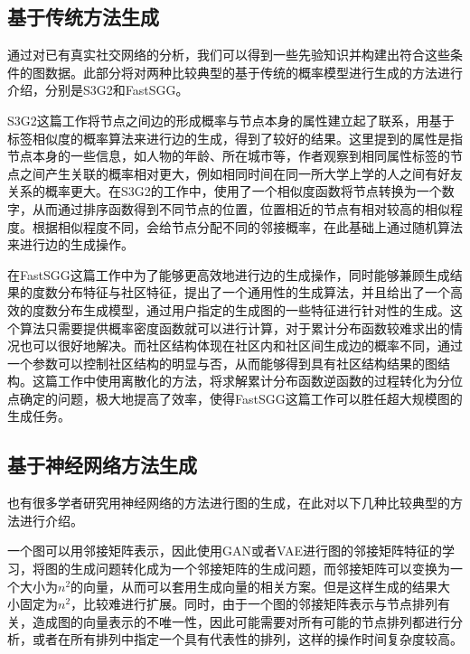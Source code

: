 \subsection{基于传统方法生成}

通过对已有真实社交网络的分析，我们可以得到一些先验知识并构建出符合这些条件的图数据。此部分将对两种比较典型的基于传统的概率模型进行生成的方法进行介绍，分别是S3G2\cite{Minh2012S3G2}和FastSGG\cite{FastSGG}。

S3G2\cite{Minh2012S3G2}这篇工作将节点之间边的形成概率与节点本身的属性建立起了联系，用基于标签相似度的概率算法来进行边的生成，得到了较好的结果。这里提到的属性是指节点本身的一些信息，如人物的年龄、所在城市等，作者观察到相同属性标签的节点之间产生关联的概率相对更大，例如相同时间在同一所大学上学的人之间有好友关系的概率更大。在S3G2的工作中，使用了一个相似度函数将节点转换为一个数字，从而通过排序函数得到不同节点的位置，位置相近的节点有相对较高的相似程度。根据相似程度不同，会给节点分配不同的邻接概率，在此基础上通过随机算法来进行边的生成操作。

在FastSGG\cite{FastSGG}这篇工作中为了能够更高效地进行边的生成操作，同时能够兼顾生成结果的度数分布特征与社区特征，提出了一个通用性的生成算法，并且给出了一个高效的度数分布生成模型，通过用户指定的生成图的一些特征进行针对性的生成。这个算法只需要提供概率密度函数就可以进行计算，对于累计分布函数较难求出的情况也可以很好地解决。而社区结构体现在社区内和社区间生成边的概率不同，通过一个参数可以控制社区结构的明显与否，从而能够得到具有社区结构结果的图结构。这篇工作中使用离散化的方法，将求解累计分布函数逆函数的过程转化为分位点确定的问题，极大地提高了效率，使得FastSGG这篇工作可以胜任超大规模图的生成任务。

\vspace{0.2cm}

\subsection{基于神经网络方法生成}

也有很多学者研究用神经网络的方法进行图的生成，在此对以下几种比较典型的方法进行介绍。

一个图可以用邻接矩阵表示，因此使用GAN或者VAE进行图的邻接矩阵特征的学习，将图的生成问题转化成为一个邻接矩阵的生成问题，而邻接矩阵可以变换为一个大小为$n^2$的向量，从而可以套用生成向量的相关方案。但是这样生成的结果大小固定为$n^2$，比较难进行扩展。同时，由于一个图的邻接矩阵表示与节点排列有关，造成图的向量表示的不唯一性，因此可能需要对所有可能的节点排列都进行分析，或者在所有排列中指定一个具有代表性的排列，这样的操作时间复杂度较高。

